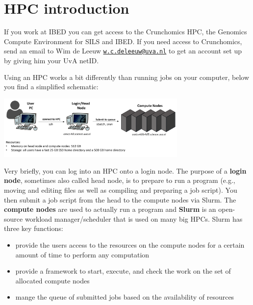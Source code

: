 \documentclass[
  letterpaper,
  DIV=11,
  numbers=noendperiod]{scrreprt}
\author{}
\date{}
\providecommand{\tightlist}{%
  \setlength{\itemsep}{0pt}\setlength{\parskip}{0pt}}\usepackage{longtable,booktabs,array}
\renewcommand*\contentsname{Table of contents}
\newcommand\contentsname{Table of contents}
\begin{document}

\renewcommand*\contentsname{Table of contents}
{
\hypersetup{linkcolor=}
\setcounter{tocdepth}{1}
\tableofcontents
}
\section{HPC introduction}\label{hpc-introduction}

If you work at IBED you can get access to the Crunchomics HPC, the
Genomics Compute Environment for SILS and IBED. If you need access to
Crunchomics, send an email to Wim de Leeuw
\href{mailto:w.c.deleeuw@uva.nl}{\nolinkurl{w.c.deleeuw@uva.nl}} to get
an account set up by giving him your UvA netID.

Using an HPC works a bit differently than running jobs on your computer,
below you find a simplified schematic:

\begin{center}
\includegraphics[width=0.7\textwidth,height=\textheight]{../img/crunchomics1.png}
\end{center}

Very briefly, you can log into an HPC onto a login node. The purpose of
a \textbf{login node}, sometimes also called head node, is to prepare to
run a program (e.g., moving and editing files as well as compiling and
preparing a job script). You then submit a job script from the head to
the compute nodes via Slurm. The \textbf{compute nodes} are used to
actually run a program and \textbf{Slurm} is an open-source workload
manager/scheduler that is used on many big HPCs. Slurm has three key
functions:

\begin{itemize}
\tightlist
\item
  provide the users access to the resources on the compute nodes for a
  certain amount of time to perform any computation
\item
  provide a framework to start, execute, and check the work on the set
  of allocated compute nodes
\item
  mange the queue of submitted jobs based on the availability of
  resources
\end{itemize}
\end{document}
